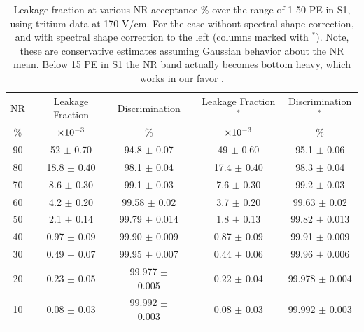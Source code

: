\renewcommand{\baselinestretch}{1}
\small\normalsize
\begin{table}[h!]
\begin{center}
\begin{tabular}{|c|c|c|c|c|c|}
\hline
 NR 	& Leakage Fraction 	& Discrimination 		&& Leakage Fraction$^{*}$ 	& Discrimination$^{*}$ \\
 	\%	&$\rm \times 10^{-3}$	&	\%					&&	$\rm \times 10^{-3}$		&	\%				       \\ \hline							
   90  	&	 	52  $\pm$ 0.70  	&	 94.8 $\pm$ 0.07   	&&	49 $\pm$ 0.60   		&	95.1 $\pm$ 0.06 		 \\ \hline
   80   	&		18.8 $\pm$ 0.40	&	 98.1 $\pm$ 0.04   	&&	17.4 $\pm$ 0.40  		&	 98.3 $\pm$ 0.04		\\ \hline
   70  	&	  	8.6  $\pm$ 0.30 	&	 99.1 $\pm$ 0.03   	&&	 7.6 $\pm$ 0.30   		&	99.2 $\pm$ 0.03		\\ \hline
   60  	&	  	4.2 $\pm$ 0.20  	&	 99.58 $\pm$ 0.02  	&&	 3.7 $\pm$ 0.20  		&	 99.63 $\pm$ 0.02		\\ \hline 
   50  	&	  	2.1 $\pm$ 0.14  	&	 99.79 $\pm$ 0.014   	&&	 1.8 $\pm$  0.13  		&	 99.82 $\pm$ 0.013	\\ \hline 
   40  	&	  	0.97  $\pm$ 0.09  	&	 99.90 $\pm$ 0.009  	&&	  0.87 $\pm$ 0.09  	&     99.91 $\pm$ 0.009	\\ \hline
   30  	&	  	0.49 $\pm$ 0.07  	&	 99.95 $\pm$ 0.007  	&&	  0.44 $\pm$ 0.06  	&      99.96 $\pm$ 0.006	\\ \hline
   20  	&	  	0.23 $\pm$ 0.05 	&	 99.977 $\pm$ 0.005  	&&   0.22 $\pm$ 0.04  		&	 99.978 $\pm$ 0.004	\\ \hline
   10   	&		0.08  $\pm$ 0.03	&	 99.992 $\pm$ 0.003	&&	  0.08 $\pm$ 0.03 		&	 99.992 $\pm$ 0.003	\\ \hline
\end{tabular}
\caption{Leakage fraction at various NR acceptance \% over the range of 1-50 PE in S1, using tritium data at 170 V/cm. For the case without spectral shape correction, and with spectral shape correction to the left (columns marked with $^*$). Note, these are conservative estimates assuming Gaussian behavior about the NR mean. Below 15 PE in S1 the NR band actually becomes bottom heavy, which works in our favor \cite{NEST} \cite{NEST_2013}.}
\label{table:NR_LeakFrac}
\end{center}
\end{table}
\renewcommand{\baselinestretch}{2}
\small\normalsize

\newpage

